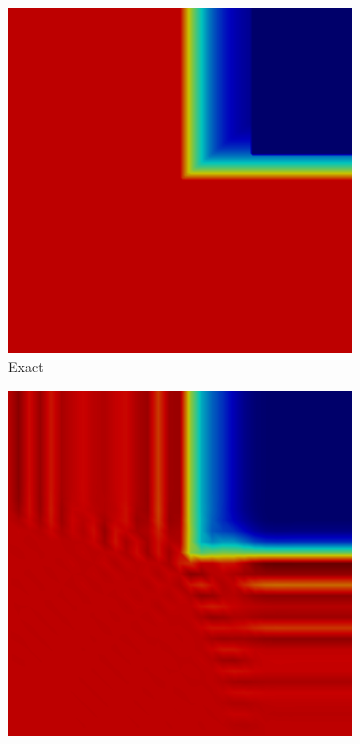 \begin{figure}[ht]
   \centering
   \begin{subfigure}{0.3\textwidth}
      \includegraphics[width=\textwidth]{skew_void_to_absorber/exact.png}
      \caption{Exact}
   \end{subfigure}
   \begin{subfigure}{0.3\textwidth}
      \includegraphics[width=\textwidth]{skew_void_to_absorber/Gal.png}

\end{subfigure}
\end{figure}
